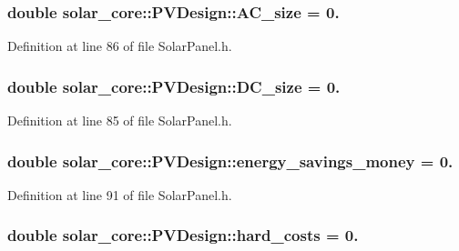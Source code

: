 \subsubsection[{A\+C\+\_\+size}]{\setlength{\rightskip}{0pt plus 5cm}double solar\+\_\+core\+::\+P\+V\+Design\+::\+A\+C\+\_\+size = 0.}\label{classsolar__core_1_1_p_v_design_a79a70e7fe3adcbc4e9256db9df38e444}


Definition at line 86 of file Solar\+Panel.\+h.

\hypertarget{classsolar__core_1_1_p_v_design_a21148518ef58004be10b91dc75fdd5b5}{}
\subsubsection[{D\+C\+\_\+size}]{\setlength{\rightskip}{0pt plus 5cm}double solar\+\_\+core\+::\+P\+V\+Design\+::\+D\+C\+\_\+size = 0.}\label{classsolar__core_1_1_p_v_design_a21148518ef58004be10b91dc75fdd5b5}


Definition at line 85 of file Solar\+Panel.\+h.

\hypertarget{classsolar__core_1_1_p_v_design_a6b777b1d9dbd1f5a06b8d67d5204340b}{}
\subsubsection[{energy\+\_\+savings\+\_\+money}]{\setlength{\rightskip}{0pt plus 5cm}double solar\+\_\+core\+::\+P\+V\+Design\+::energy\+\_\+savings\+\_\+money = 0.}\label{classsolar__core_1_1_p_v_design_a6b777b1d9dbd1f5a06b8d67d5204340b}


Definition at line 91 of file Solar\+Panel.\+h.

\hypertarget{classsolar__core_1_1_p_v_design_a18cec349cd8f04efcb67562e30416860}{}
\subsubsection[{hard\+\_\+costs}]{\setlength{\rightskip}{0pt plus 5cm}double solar\+\_\+core\+::\+P\+V\+Design\+::hard\+\_\+costs = 0.}\label{classsolar__core_1_1_p_v_design_a18cec349cd8f04efcb67562e30416860}


